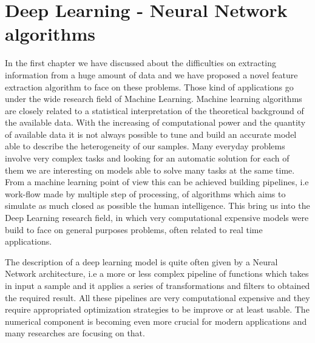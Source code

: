 \documentclass{standalone}
\begin{document}
\chapter[Deep Learning]{Deep Learning - Neural Network algorithms}\label{chapter2:neural}

In the first chapter we have discussed about the difficulties on extracting information from a huge amount of data and we have proposed a novel feature extraction algorithm to face on these problems.
Those kind of applications go under the wide research field of Machine Learning.
Machine learning algorithms are closely related to a statistical interpretation of the theoretical background of the available data.
With the increasing of computational power and the quantity of available data it is not always possible to tune and build an accurate model able to describe the heterogeneity of our samples.
Many everyday problems involve very complex tasks and looking for an automatic solution for each of them we are interesting on models able to solve many tasks at the same time.
From a machine learning point of view this can be achieved building pipelines, i.e work-flow made by multiple step of processing, of algorithms which aims to simulate as much closed as possible the human intelligence.
This bring us into the Deep Learning research field, in which very computational expensive models were build to face on general purposes problems, often related to real time applications.

The description of a deep learning model is quite often given by a Neural Network architecture, i.e a more or less complex pipeline of functions which takes in input a sample and it applies a series of transformations and filters to obtained the required result.
All these pipelines are very computational expensive and they require appropriated optimization strategies to be improve or at least usable.
The numerical component is becoming even more crucial for modern applications and many researches are focusing on that.
\end{document}
